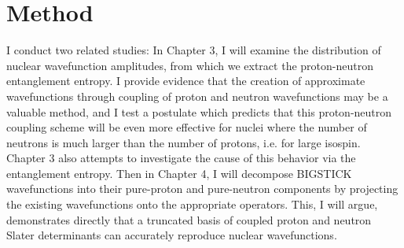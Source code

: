 \section{Method}
I conduct two related studies: In Chapter 3, I will examine the distribution of
nuclear wavefunction amplitudes, from which we extract the
proton-neutron entanglement entropy. I provide evidence that the creation of approximate wavefunctions
through coupling of proton and neutron wavefunctions may be a 
valuable method, and I test a postulate which predicts
that this proton-neutron coupling scheme will be even more effective for
nuclei where the number of neutrons is much larger than the number of 
protons, i.e. for large isospin. Chapter 3 also attempts to investigate the
cause of this behavior via the entanglement entropy.
Then in Chapter 4, I will decompose BIGSTICK
wavefunctions into their pure-proton and pure-neutron components by projecting
the existing wavefunctions onto the appropriate operators. This, I will argue, 
demonstrates directly that a truncated basis of coupled proton and neutron 
Slater determinants can accurately reproduce nuclear wavefunctions.




